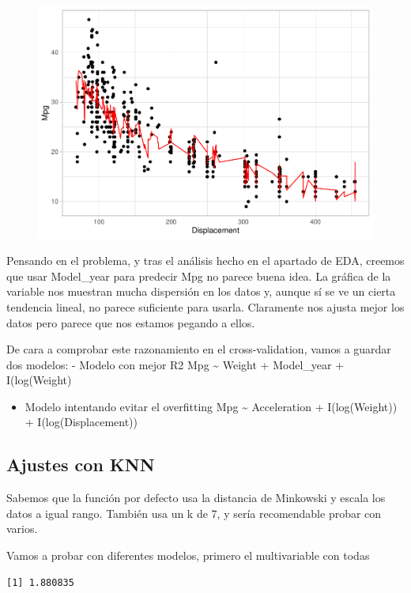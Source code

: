 \begin{figure}[H]\includegraphics[width=.9\linewidth]{img/Regresion_files/figure-latex/unnamed-chunk-26-3} \caption{}\end{figure}

Pensando en el problema, y tras el análisis hecho en el apartado de EDA, creemos que usar Model\_year para predecir Mpg no parece buena idea. La gráfica de la variable nos muestran mucha dispersión en los datos y, aunque sí se ve un cierta tendencia lineal, no parece suficiente para usarla. Claramente nos ajusta mejor los datos pero parece que nos estamos pegando a ellos.

De cara a comprobar este razonamiento en el cross-validation, vamos a guardar dos modelos: - Modelo con mejor R2 Mpg \textasciitilde{} Weight + Model\_year + I(log(Weight)

\begin{itemize}
\item
  Modelo intentando evitar el overfitting Mpg \textasciitilde{}
  Acceleration + I(log(Weight)) + I(log(Displacement))
\end{itemize}

\subsection{Ajustes con KNN}

Sabemos que la función por defecto usa la distancia de Minkowski y escala los datos a igual rango. También usa un k de 7, y sería recomendable probar con varios.

Vamos a probar con diferentes modelos, primero el multivariable con todas

\begin{verbatim}
[1] 1.880835
\end{verbatim}

